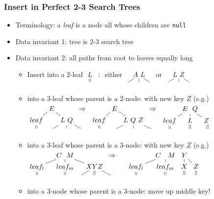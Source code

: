 \documentclass[handout]{beamer}
\begin{document}
\begin{frame}
    \frametitle{Insert in Perfect 2-3 Search Trees}

\begin{itemize}[<+->]
\item Terminology: a \emph{leaf} is a node all whose children are {\tt null}
\item Data invariant 1: tree is 2-3 search tree
\item Data invariant 2: all paths from root to leaves equally long
 \begin{itemize}[<+->]
 \item Insert into a 2-leaf 
 $\xymatrix@R=.1cm@C=.1cm{L \ar@{=}[d]&:\\&\\}$
 either
 $\xymatrix@R=.1cm@C=.1cm{&A~L\ar@{-}[dl]\ar@{-}[d]\ar@{-}[rd]&\\&&\\}$
 or
 $\xymatrix@R=.1cm@C=.1cm{&L~Z\ar@{-}[dl]\ar@{-}[d]\ar@{-}[rd]&\\&&\\}$
 \item  into a 3-leaf whose parent is a 2-node: with new key $Z$ (e.g.)
 $\xymatrix@R=.1cm@C=.1cm{
 &\ar@{-}[dl]E\ar@{-}[rd]&&\Rightarrow\\
 leaf\ar@{=}[d]&&L~Q\ar@{-}[dl]\ar@{-}[d]\ar@{-}[rd]&\\
 &&&\\}$
 $\xymatrix@R=.1cm@C=.1cm{
 &\ar@{-}[dl]E\ar@{-}[rd]&&\Rightarrow\\
 leaf\ar@{=}[d]&&L~Q~Z\ar@{-}[dl]\ar@{-}[d]\ar@{-}[rd]&\\
 &&&\\}$
 $\xymatrix@R=.1cm@C=.1cm{
 &\ar@{-}[dl]E~~Q\ar@{-}[d]\ar@{-}[rd]&\\
 leaf\ar@{=}[d]&L\ar@{=}[d]&Z~\ar@{=}[d]\\
 &&\\}$
  \item  into a 3-leaf whose parent is a 3-node: with new key $Z$ (e.g.)
 $\xymatrix@R=.1cm@C=.1cm{
 &&\ar@{-}[dll]C~~M\ar@{-}[d]\ar@{-}[rrd]&&&\Rightarrow\\
 leaf_l\ar@{=}[d]&&leaf_m\ar@{=}[d]&&\ar@{-}[ld]XYZ\ar@{=}[d]\ar@{-}[rd]&\\
 &&&&&&\\}$
 $\xymatrix@R=.1cm@C=.1cm{
 &&\ar@{-}[dll]C~~~M\ar@{-}[d]&Y\ar@{-}[d]\ar@{-}[rd]&&\\
 leaf_l\ar@{=}[d]&&leaf_m\ar@{=}[d]&\ar@{=}[d]X&Z\ar@{=}[d]&\\
 &&&&&&\\}$
 \item  into a 3-node whose parent is a 3-node: move up middle key!
 \end{itemize}     
\end{itemize}     
\end{frame}
\end{document}
